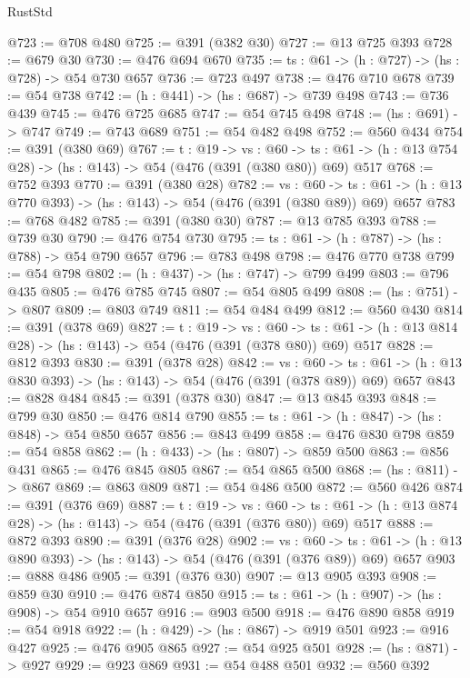 \begin{lexlean}{RustStd}
\begin{coremodule}
@723 := @708 @480
@725 := @391 (@382 @30)
@727 := @13 @725 @393
@728 := @679 @30
@730 := @476 @694 @670
@735 := {ts : @61} -> (h : @727) -> (hs : @728) -> @54 @730 @657
@736 := @723 @497
@738 := @476 @710 @678
@739 := @54 @738
@742 := (h : @441) -> (hs : @687) -> @739 @498
@743 := @736 @439
@745 := @476 @725 @685
@747 := @54 @745 @498
@748 := (hs : @691) -> @747
@749 := @743 @689
@751 := @54 @482 @498
@752 := @560 @434
@754 := @391 (@380 @69)
@767 := {t : @19} ->
  {vs : @60} ->
  {ts : @61} -> (h : @13 @754 @28) -> (hs : @143) -> @54 (@476 (@391 (@380 @80)) @69) @517
@768 := @752 @393
@770 := @391 (@380 @28)
@782 := {vs : @60} ->
  {ts : @61} -> (h : @13 @770 @393) -> (hs : @143) -> @54 (@476 (@391 (@380 @89)) @69) @657
@783 := @768 @482
@785 := @391 (@380 @30)
@787 := @13 @785 @393
@788 := @739 @30
@790 := @476 @754 @730
@795 := {ts : @61} -> (h : @787) -> (hs : @788) -> @54 @790 @657
@796 := @783 @498
@798 := @476 @770 @738
@799 := @54 @798
@802 := (h : @437) -> (hs : @747) -> @799 @499
@803 := @796 @435
@805 := @476 @785 @745
@807 := @54 @805 @499
@808 := (hs : @751) -> @807
@809 := @803 @749
@811 := @54 @484 @499
@812 := @560 @430
@814 := @391 (@378 @69)
@827 := {t : @19} ->
  {vs : @60} ->
  {ts : @61} -> (h : @13 @814 @28) -> (hs : @143) -> @54 (@476 (@391 (@378 @80)) @69) @517
@828 := @812 @393
@830 := @391 (@378 @28)
@842 := {vs : @60} ->
  {ts : @61} -> (h : @13 @830 @393) -> (hs : @143) -> @54 (@476 (@391 (@378 @89)) @69) @657
@843 := @828 @484
@845 := @391 (@378 @30)
@847 := @13 @845 @393
@848 := @799 @30
@850 := @476 @814 @790
@855 := {ts : @61} -> (h : @847) -> (hs : @848) -> @54 @850 @657
@856 := @843 @499
@858 := @476 @830 @798
@859 := @54 @858
@862 := (h : @433) -> (hs : @807) -> @859 @500
@863 := @856 @431
@865 := @476 @845 @805
@867 := @54 @865 @500
@868 := (hs : @811) -> @867
@869 := @863 @809
@871 := @54 @486 @500
@872 := @560 @426
@874 := @391 (@376 @69)
@887 := {t : @19} ->
  {vs : @60} ->
  {ts : @61} -> (h : @13 @874 @28) -> (hs : @143) -> @54 (@476 (@391 (@376 @80)) @69) @517
@888 := @872 @393
@890 := @391 (@376 @28)
@902 := {vs : @60} ->
  {ts : @61} -> (h : @13 @890 @393) -> (hs : @143) -> @54 (@476 (@391 (@376 @89)) @69) @657
@903 := @888 @486
@905 := @391 (@376 @30)
@907 := @13 @905 @393
@908 := @859 @30
@910 := @476 @874 @850
@915 := {ts : @61} -> (h : @907) -> (hs : @908) -> @54 @910 @657
@916 := @903 @500
@918 := @476 @890 @858
@919 := @54 @918
@922 := (h : @429) -> (hs : @867) -> @919 @501
@923 := @916 @427
@925 := @476 @905 @865
@927 := @54 @925 @501
@928 := (hs : @871) -> @927
@929 := @923 @869
@931 := @54 @488 @501
@932 := @560 @392

\end{coremodule}
\end{lexlean}
